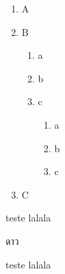 \documentclass{article}%
\begin{document}
%



\begin{enumerate}
	\item A
	\item B	
	\begin{enumerate}
		\item a
		\item b	
		\item c	
        	\begin{enumerate}
                \item a
                \item b	
                \item c	
            \end{enumerate}
	\end{enumerate}
	\item C	
\end{enumerate}

%

teste lalala

ดาว

teste lalala


\end{document}
